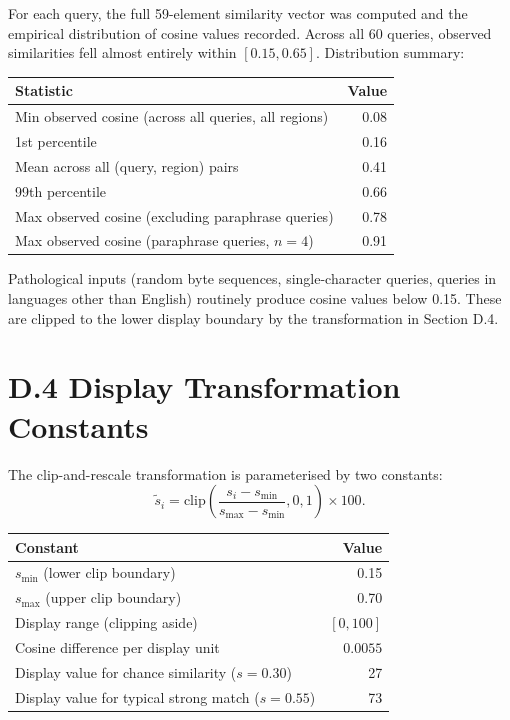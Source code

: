 \documentclass[11pt]{article}
\begin{document}
For each query, the full 59-element similarity vector was computed and the empirical distribution of cosine values recorded. Across all 60 queries, observed similarities fell almost entirely within $[0.15, 0.65]$. Distribution summary:

\begin{center}
\begin{tabular}{@{}lr@{}}
\toprule
Statistic & Value \\
\midrule
Min observed cosine (across all queries, all regions) & 0.08 \\
1st percentile                                          & 0.16 \\
Mean across all (query, region) pairs                  & 0.41 \\
99th percentile                                         & 0.66 \\
Max observed cosine (excluding paraphrase queries)     & 0.78 \\
Max observed cosine (paraphrase queries, $n = 4$)      & 0.91 \\
\bottomrule
\end{tabular}
\end{center}

Pathological inputs (random byte sequences, single-character queries, queries in languages other than English) routinely produce cosine values below 0.15. These are clipped to the lower display boundary by the transformation in Section D.4.

\section*{D.4 Display Transformation Constants}
The clip-and-rescale transformation is parameterised by two constants:
\[
\tilde{s}_i = \mathrm{clip}\!\left(\frac{s_i - s_{\min}}{s_{\max} - s_{\min}}, 0, 1\right) \times 100.
\]

\begin{center}
\begin{tabular}{@{}lr@{}}
\toprule
Constant & Value \\
\midrule
$s_{\min}$ (lower clip boundary)        & 0.15 \\
$s_{\max}$ (upper clip boundary)        & 0.70 \\
Display range (clipping aside)          & $[0, 100]$ \\
Cosine difference per display unit      & $0.0055$ \\
Display value for chance similarity ($s = 0.30$) & 27 \\
Display value for typical strong match ($s = 0.55$) & 73 \\
\bottomrule
\end{tabular}
\end{center}
\end{document}
